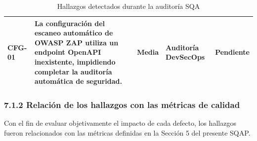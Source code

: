 \begin{table}[H]
\begin{tabular}{|p{1.5cm}|p{5.8cm}|p{2cm}|p{2.8cm}|p{2cm}|}
        CFG-01                                                                                                                                                   &
        La configuración del escaneo automático de OWASP ZAP utiliza un endpoint OpenAPI inexistente, impidiendo completar la auditoría automática de seguridad. &
        Media                                                                                                                                                    &
        Auditoría DevSecOps                                                                                                                                      &
        Pendiente                                                                                                                                                  \\
        \hline
    \end{tabular}
    \caption{Hallazgos detectados durante la auditoría SQA}
    \label{tab:hallazgos}
\end{table}

\subsubsection{7.1.2 Relación de los hallazgos con las métricas de calidad}

Con el fin de evaluar objetivamente el impacto de cada defecto, los hallazgos fueron relacionados con las métricas definidas en la Sección 5 del presente SQAP.

